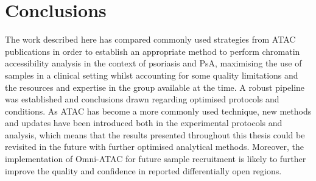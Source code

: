 \section{Conclusions}
The work described here has compared commonly used strategies from ATAC publications in order to establish an appropriate method to perform chromatin accessibility analysis in the context of psoriasis and PsA, maximising the use of samples in a clinical setting whilst accounting for some quality limitations and the resources and expertise in the group available at the time. A robust pipeline was established and conclusions drawn regarding optimised protocols and conditions. As ATAC has become a more commonly used technique, new methods and updates have been introduced both in the experimental protocols and analysis, which means that the results presented throughout this thesis could be revisited in the future with further optimised analytical methods. Moreover, the implementation of Omni-ATAC for future sample recruitment is likely to further improve the quality and confidence in reported differentially open regions.
